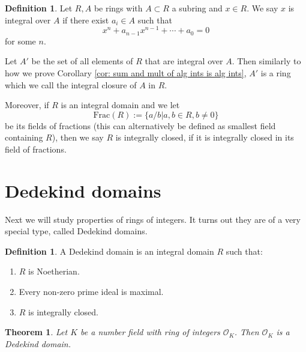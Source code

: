 \documentclass[11pt,a4paper]{report}
\theoremstyle{plain}
\newtheorem{theorem}[subsection]{Theorem}
\theoremstyle{definition}
\newtheorem{definition}[subsection]{Definition}
\theoremstyle{definition}
\def \OO {\mathcal{O}}
\begin{document}
	
	\begin{definition}
		Let $R,A$ be rings with $A \subset R$ a subring and $x \in R$. We say $x$ is integral over $A$ if there exist $a_i \in A$ such that \[x^n+a_{n-1}x^{n-1}+\cdots+a_0=0\] for some $n$.
		
		Let $A'$ be the set of all elements of $R$ that are integral over $A$. Then similarly to how we prove Corollary \ref{cor: sum and mult of alg ints is alg ints}, $A'$ is a ring which we call the integral closure of $A$ in $R$.
		
		Moreover, if $R$ is an integral domain and we let \[\mathrm{Frac}(R):=\{a/b | a,b \in R, b \neq 0\}\] be its fields of fractions (this can alternatively be defined as smallest field containing $R$), then we say $R$ is integrally closed, if it is integrally closed in its field of fractions.
		
	\end{definition}
	
	
	
	
	\section{Dedekind domains}
	Next we will study properties of rings of integers. It turns out they are of a very special type, called Dedekind domains.
	
	\begin{definition}\label{definition: ded dom}
		A Dedekind domain is an integral domain $R$ such that:
		
		\begin{enumerate}
			\item $R$ is Noetherian.
			\item Every non-zero prime ideal is maximal.
			\item $R$ is integrally closed.
		\end{enumerate}
	\end{definition}
	
	
	\begin{theorem}
		Let $K$ be a number field with ring of integers $\OO_K$. Then $\OO_K$ is a Dedekind domain.
	\end{theorem}
	
\end{document}
